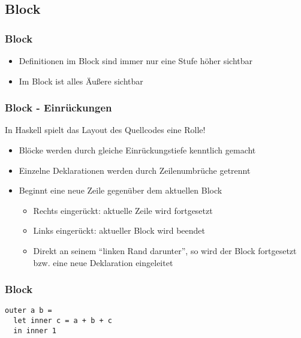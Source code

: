 \subsection{Block}
\begin{frame}
\frametitle{Block}
\begin{block}{\vspace*{-3ex}}
\begin{itemize}
  \item Definitionen im Block sind immer nur eine Stufe höher sichtbar
  \item Im Block ist alles Äußere sichtbar
\end{itemize}
\end{block}
\end{frame}

\begin{frame}
\frametitle{Block - Einrückungen}
\begin{block}{\vspace*{-3ex}}
In Haskell spielt das Layout des Quellcodes eine Rolle!
\begin{itemize}
  \item Blöcke werden durch gleiche Einrückungstiefe kenntlich gemacht
  \item Einzelne Deklarationen werden durch Zeilenumbrüche getrennt
  \item Beginnt eine neue Zeile gegenüber dem aktuellen Block \\
  \begin{itemize}
    \item Rechts eingerückt: aktuelle Zeile wird fortgesetzt
    \item Links eingerückt: aktueller Block wird beendet
    \item Direkt an seinem "`linken Rand darunter"', so wird der Block fortgesetzt bzw. eine neue Deklaration eingeleitet 
  \end{itemize}
\end{itemize}
\end{block}
\end{frame}

\begin{frame}[fragile]
\frametitle{Block} 
\begin{lstlisting}
outer a b =
  let inner c = a + b + c
  in inner 1
\end{lstlisting}
\end{frame}
